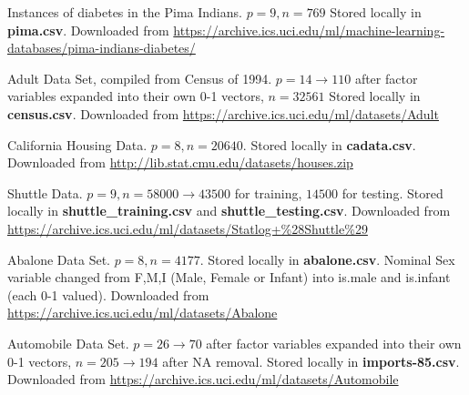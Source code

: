\documentclass[letter]{article}
\begin{document}
\begin{thebibliography}{99}
    
      Instances of diabetes in the Pima Indians. $p=9, n=769$ Stored locally in \textbf{pima.csv}. Downloaded from \url{https://archive.ics.uci.edu/ml/machine-learning-databases/pima-indians-diabetes/} 
  
     Adult Data Set, compiled from Census of 1994. $p=14 \rightarrow 110$ after factor variables expanded into their own 0-1 vectors, $n=32561$ Stored locally in \textbf{census.csv}. Downloaded from \url{https://archive.ics.uci.edu/ml/datasets/Adult} 
    
     California Housing Data.  $p = 8, n=20640$. Stored locally in \textbf{cadata.csv}. Downloaded from \url{http://lib.stat.cmu.edu/datasets/houses.zip}
	
	 Shuttle Data.  $p = 9, n = 58000 \rightarrow 43500$ for training, $14500$ for testing. Stored locally in \textbf{shuttle\_training.csv} and \textbf{shuttle\_testing.csv}. Downloaded from \url{https://archive.ics.uci.edu/ml/datasets/Statlog+\%28Shuttle\%29}
    
     Abalone Data Set. $p = 8, n = 4177$. Stored locally in \textbf{abalone.csv}. Nominal Sex variable changed from F,M,I (Male, Female or Infant) into is.male and is.infant (each 0-1 valued). Downloaded from \url{https://archive.ics.uci.edu/ml/datasets/Abalone}
    
     Automobile Data Set. $p = 26 \rightarrow 70$ after factor variables expanded into their own 0-1 vectors, $n = 205 \rightarrow 194$ after NA removal. Stored locally in \textbf{imports-85.csv}. Downloaded from \url{https://archive.ics.uci.edu/ml/datasets/Automobile}
    
\end{thebibliography} 
 
\end{document}
